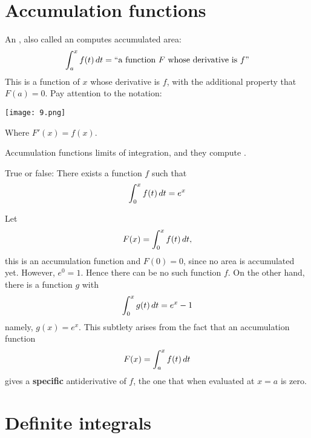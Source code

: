 \documentclass{ximera}
\begin{document}
\section{Accumulation functions}

An , also called an 
computes accumulated area:
\[
\int_a^x f(t) \mathop{}\!d t = \text{``a function $F$ whose derivative is $f$''}
\]
This is a function of $x$ whose derivative is $f$, with the additional
property that $F(a)=0$.  Pay attention to the notation:
\begin{image}
  \texttt{[image: 9.png]}
\end{image}
Where $F'(x) = f(x)$.
\begin{explanation}%
  Accumulation functions  limits of integration, and they compute
  .
\end{explanation}
\begin{question}
  True or false: There exists a function $f$ such that 
  \[
  \int_0^x f(t) \mathop{}\!d t = e^x
  \]
  \begin{prompt}
  \begin{multipleChoice}
  \end{multipleChoice}
  \begin{feedback}
    Let
    \[
    F(x) = \int_0^x f(t) \mathop{}\!d t,
    \]
    this is an accumulation function and $F(0) = 0$, since no area is
    accumulated yet. However, $e^0 =1$. Hence there can be no such
    function $f$. On the other hand, there is a function $g$ with
     \[
     \int_0^x g(t) \mathop{}\!d t = e^x-1
     \]
     namely, $g(x) = e^x$. This subtlety arises from the fact that an
     accumulation function
     \[
     F(x) = \int_a^x f(t) \mathop{}\!d t
     \]
     gives a \textbf{specific} antiderivative of $f$, the one that
     when evaluated at $x=a$ is zero.
  \end{feedback}
  \end{prompt}
\end{question}










\section{Definite integrals}
\end{document}
